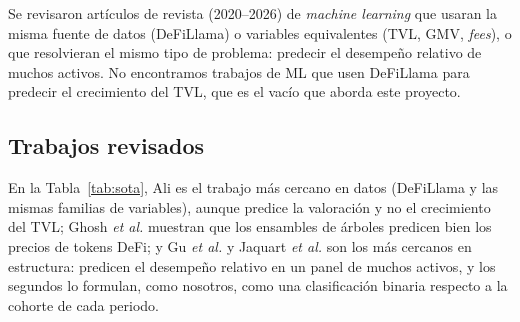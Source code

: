 \documentclass[letterpaper,journal]{IEEEtran}
\begin{document}
Se revisaron artículos de revista (2020--2026) de \emph{machine learning} que
usaran la misma fuente de datos (DeFiLlama) o variables equivalentes (TVL, GMV,
\emph{fees}), o que resolvieran el mismo tipo de problema: predecir el desempeño
relativo de muchos activos. No encontramos trabajos de ML que usen DeFiLlama
para predecir el crecimiento del TVL, que es el vacío que aborda este proyecto.

\subsection{Trabajos revisados}

En la Tabla~\ref{tab:sota}, Ali \cite{ali2026} es el trabajo más cercano en
datos (DeFiLlama y las mismas familias de variables), aunque predice la
valoración y no el crecimiento del TVL; Ghosh \emph{et al.} \cite{ghosh2023}
muestran que los ensambles de árboles predicen bien los precios de tokens DeFi;
y Gu \emph{et al.} \cite{gukellyxiu2020} y Jaquart \emph{et al.}
\cite{jaquart2022} son los más cercanos en estructura: predicen el desempeño
relativo en un panel de muchos activos, y los segundos lo formulan, como
nosotros, como una clasificación binaria respecto a la cohorte de cada periodo.
\end{document}
